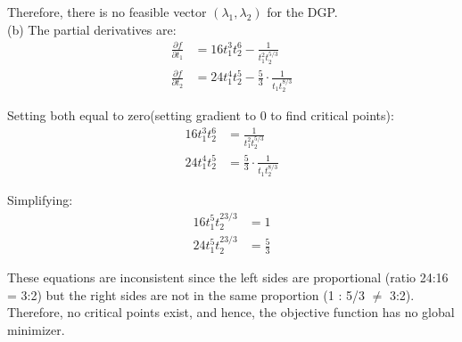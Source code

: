 \documentclass{article}
\begin{document}
Therefore, there is no feasible vector $(\lambda_1, \lambda_2)$ for the DGP. \\

(b) The partial derivatives are:
\begin{align*}
\frac{\partial f}{\partial t_1} &= 16t_1^3 t_2^6 - \frac{1}{t_1^2 t_2^{5/3}} \\
\frac{\partial f}{\partial t_2} &= 24t_1^4 t_2^5 - \frac{5}{3} \cdot \frac{1}{t_1 t_2^{8/3}}
\end{align*}

Setting both equal to zero(setting gradient to 0 to find critical points):
\begin{align*}
16t_1^3 t_2^6 &= \frac{1}{t_1^2 t_2^{5/3}} \\
24t_1^4 t_2^5 &= \frac{5}{3} \cdot \frac{1}{t_1 t_2^{8/3}}
\end{align*}

Simplifying:
\begin{align*}
16t_1^5 t_2^{23/3} &= 1 \\
24t_1^5 t_2^{23/3} &= \frac{5}{3}
\end{align*}

These equations are inconsistent since the left sides are proportional (ratio 24:16 = 3:2) but the right sides are not in the same proportion (1 : 5/3 $\neq$ 3:2). Therefore, no critical points exist, and hence, the objective function has no global minimizer.
\end{document}
